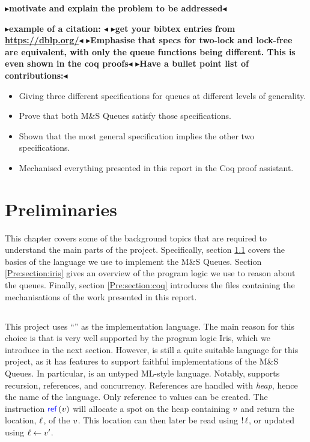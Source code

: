 \documentclass[a4paper, 10pt]{report}
\theoremstyle{definition}
\newcommand{\msq}{M\&S Queue}
\newcommand{\todo}[1]{{\color[rgb]{.5,0,0}\textbf{$\blacktriangleright$#1$\blacktriangleleft$}}}
\begin{document}
\todo{motivate and explain the problem to be addressed}

\todo{example of a citation: \cite{DBLP:conf/podc/MichaelS96}}
\todo{get your bibtex entries from \url{https://dblp.org/}}
\todo{Emphasise that specs for two-lock and lock-free are equivalent, with only the queue functions being different. This is even shown in the coq proofs}
\todo{Have a bullet point list of contributions:}
\begin{itemize}
  \item Giving three different specifications for queues at different levels of generality.
  \item Prove that both \msq{}s satisfy those specifications.
  \item Shown that the most general specification implies the other two specifications.
  \item Mechanised everything presented in this report in the Coq proof assistant.
\end{itemize}


\chapter{Preliminaries}
\label{ch:preliminaries}

This chapter covers some of the background topics that are required to understand the main parts of the project. Specifically, section \ref{Pre:section:heaplang} covers the basics of the language we use to implement the \msq{}s. Section \ref{Pre:section:iris} gives an overview of the program logic we use to reason about the queues. Finally, section \ref{Pre:section:coq} introduces the files containing the mechanisations of the work presented in this report.

\section{\heaplang}
\label{Pre:section:heaplang}

This project uses ``\heaplang'' as the implementation language. The main reason for this choice is that \heaplang is very well supported by the program logic Iris, which we introduce in the next section. However, \heaplang is still a quite suitable language for this project, as it has features to support faithful implementations of the \msq{}s. In particular, \heaplang is an untyped ML-style language. Notably, \heaplang supports recursion, references, and concurrency. References are handled with \textit{heap}, hence the name of the language. Only reference to values can be created. The instruction $\Ref(\val)$ will allocate a spot on the heap containing $v$ and return the location, $\ell$, of the $v$. This location can then later be read using $\mathop{!} \ell$, or updated using $\ell \leftarrow v'$.
\end{document}
